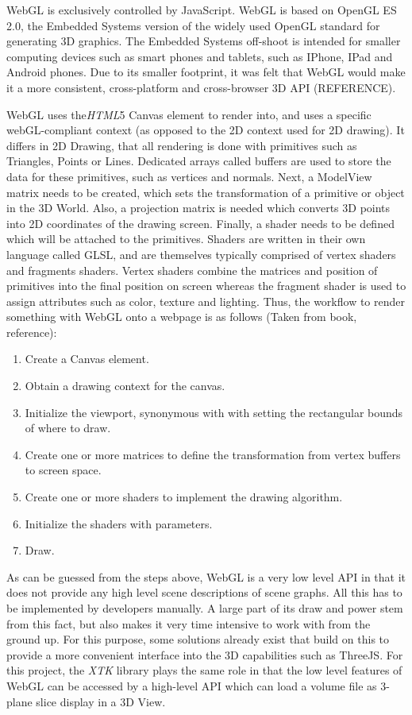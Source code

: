 \documentclass[a4paper,11pt,twoside]{article}
\begin{document}
WebGL is exclusively controlled by JavaScript. WebGL is based on OpenGL ES 2.0, the Embedded Systems version of the widely used OpenGL standard for generating 3D graphics. The Embedded Systems off-shoot is intended for smaller computing devices such as smart phones and tablets, such as IPhone, IPad and Android phones. Due to its smaller footprint, it was felt that WebGL would make it a more consistent, cross-platform and cross-browser 3D API (REFERENCE). 

WebGL uses the\textit{HTML}5 Canvas element to render into, and uses a specific webGL-compliant context (as opposed to the 2D context used for 2D drawing). It differs in 2D Drawing, that all rendering is done with primitives such as Triangles, Points or Lines. 
Dedicated arrays called buffers are used to store the data for these primitives, such as vertices and normals. Next, a ModelView matrix needs to be created, which sets the transformation of a primitive or object in the 3D World. Also, a projection matrix is needed which converts 3D points into 2D coordinates of the drawing screen. Finally, a shader needs to be defined which will be attached to the primitives. Shaders are written in their own language called GLSL, and are themselves typically comprised of vertex shaders and fragments shaders. Vertex shaders combine the matrices and position of primitives into the final position on screen whereas the fragment shader is used to assign attributes such as color, texture and lighting. Thus, the workflow to render something with WebGL onto a webpage is as follows (Taken from book, reference):

\begin{enumerate}
\item Create a Canvas element.
\item Obtain a drawing context for the canvas.
\item Initialize the viewport, synonymous with with setting the rectangular bounds of where to draw.
\item Create one or more matrices to define the transformation from vertex buffers to screen space.
\item Create one or more shaders to implement the drawing algorithm.
\item Initialize the shaders with parameters.
\item Draw.
\end{enumerate}


As can be guessed from the steps above, WebGL is a very low level API in that it does not provide any high level scene descriptions of scene graphs. All this has to be implemented by developers manually. A large part of its draw and power stem from this fact, but also makes it very time intensive to work with from the ground up. For this purpose, some solutions already exist that build on this to provide a more convenient interface into the 3D capabilities such as ThreeJS. For this project, the \textit{XTK} library plays the same role in that the low level features of WebGL can be accessed by a high-level API which can load a volume file as 3-plane slice display in a 3D View.
\end{document}
